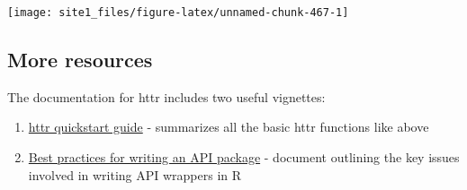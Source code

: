 \documentclass[]{book}
\newenvironment{Shaded}{\begin{snugshade}}{\end{snugshade}}
\newcommand{\KeywordTok}[1]{\textcolor[rgb]{0.13,0.29,0.53}{\textbf{#1}}}
\newcommand{\DataTypeTok}[1]{\textcolor[rgb]{0.13,0.29,0.53}{#1}}
\newcommand{\DecValTok}[1]{\textcolor[rgb]{0.00,0.00,0.81}{#1}}
\newcommand{\StringTok}[1]{\textcolor[rgb]{0.31,0.60,0.02}{#1}}
\newcommand{\CommentTok}[1]{\textcolor[rgb]{0.56,0.35,0.01}{\textit{#1}}}
\newcommand{\OperatorTok}[1]{\textcolor[rgb]{0.81,0.36,0.00}{\textbf{#1}}}
\newcommand{\NormalTok}[1]{#1}
\providecommand{\tightlist}{%
  \setlength{\itemsep}{0pt}\setlength{\parskip}{0pt}}
\begin{document}
\begin{Shaded}
\end{Shaded}

\begin{center}\texttt{[image: site1\_files/figure-latex/unnamed-chunk-467-1]} \end{center}

\subsection{More resources}\label{more-resources-1}

The documentation for httr includes two useful vignettes:

\begin{enumerate}
\def\labelenumi{\arabic{enumi}.}
\tightlist
\item
  \href{https://cran.r-project.org/web/packages/httr/vignettes/quickstart.html}{httr
  quickstart guide} - summarizes all the basic httr functions like above
\item
  \href{https://cran.r-project.org/web/packages/httr/vignettes/api-packages.html}{Best
  practices for writing an API package} - document outlining the key
  issues involved in writing API wrappers in R
\end{enumerate}
\end{document}
